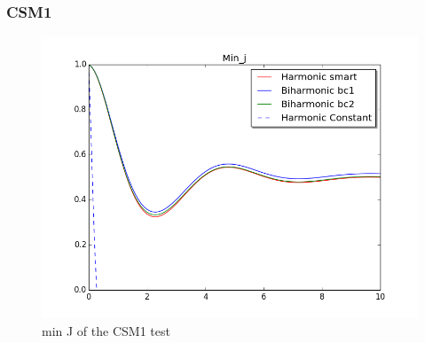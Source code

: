\subsubsection*{CSM1}
\begin{figure}[H]
\label{fig:fluid_structure}
\includegraphics[scale=0.60, trim={0mm 0mm 0mm 0mm},clip]{./Verification_Validation/Mesh_motion_results/CSM1.png}
\caption{min J of the CSM1 test}
\end{figure}

